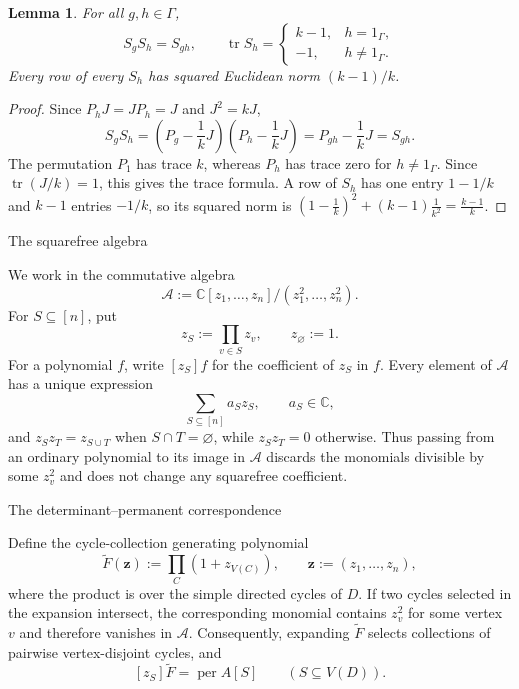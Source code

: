 \documentclass[11pt]{amsart}
\makeatletter
\def\subsection{\@startsection{subsection}{2}%
  \z@{1.05\linespacing\@plus.5\linespacing}{.4\linespacing}%
  {\normalfont\large\bfseries\raggedright}}
\newtheorem{lemma}[theorem]{Lemma}
\theoremstyle{remark}
\newcommand{\per}{\operatorname{per}}
\newcommand{\tr}{\operatorname{tr}}
\makeatother
\begin{document}
\begin{lemma}\label{lem:centered}
For all $g,h\in\Gamma$,
\[
  S_gS_h=S_{gh},
  \qquad
  \tr S_h=
  \begin{cases}
    k-1,&h=1_\Gamma,\\
    -1,&h\ne1_\Gamma.
  \end{cases}
\]
Every row of every $S_h$ has squared Euclidean norm $(k-1)/k$.
\end{lemma}

\begin{proof}
Since $P_hJ=JP_h=J$ and $J^2=kJ$,
\[
  S_gS_h
  =\left(P_g-\frac1kJ\right)\left(P_h-\frac1kJ\right)
  =P_{gh}-\frac1kJ
  =S_{gh}.
\]
The permutation $P_1$ has trace $k$, whereas $P_h$ has trace zero for
$h\ne1_\Gamma$.  Since $\tr(J/k)=1$, this gives the trace formula.  A
row of $S_h$ has one entry $1-1/k$ and $k-1$ entries $-1/k$, so its
squared norm is $\left(1-\frac1k\right)^2+(k-1)\frac1{k^2}
  =\frac{k-1}{k}$.
\end{proof}

\subsection{The squarefree algebra}

We work in the commutative algebra
\[
  \mathcal A:=
  \mathbb C[z_1,\ldots,z_n]/(z_1^2,\ldots,z_n^2).
\]
For $S\subseteq[n]$, put
\[
  z_S:=\prod_{v\in S}z_v,
  \qquad z_\varnothing:=1.
\]
For a polynomial $f$, write $[z_S]f$ for the coefficient of $z_S$ in
$f$.
Every element of $\mathcal A$ has a unique expression
\[
  \sum_{S\subseteq[n]}a_Sz_S,
  \qquad a_S\in\mathbb C,
\]
and $z_Sz_T=z_{S\cup T}$ when $S\cap T=\varnothing$, while
$z_Sz_T=0$ otherwise.
Thus passing from an ordinary polynomial to its image in $\mathcal A$
discards the monomials divisible by some $z_v^2$ and does not change
any squarefree coefficient.

\subsection{The determinant--permanent correspondence}

Define the cycle-collection generating polynomial
\[
  \widetilde F(\mathbf z):=
  \prod_C(1+z_{V(C)}),
  \qquad \mathbf z:=(z_1,\ldots,z_n),
\]
where the product is over the simple directed cycles of $D$.  If two
cycles selected in the expansion intersect, the corresponding monomial
contains $z_v^2$ for some vertex $v$ and therefore vanishes in
$\mathcal A$.  Consequently,
expanding $\widetilde F$ selects collections of pairwise vertex-disjoint
cycles, and
\begin{equation}\label{eq:cycle-cover-permanent}
  [z_S]\widetilde F=\per A[S]
  \qquad(S\subseteq V(D)).
\end{equation}
\end{document}
